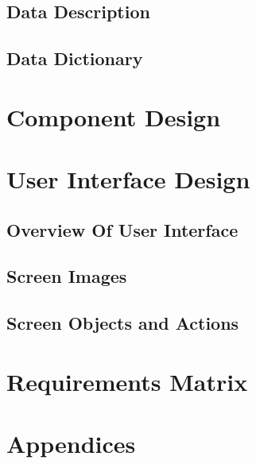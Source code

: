 \documentclass{article}
\begin{document}
\subsection{Data Description}

\subsection{Data Dictionary}

\section{Component Design}

\section{User Interface Design}

\subsection{Overview Of User Interface}

\subsection{Screen Images}

\subsection{Screen Objects and Actions}

\section{Requirements Matrix}

\section{Appendices}
\end{document}
